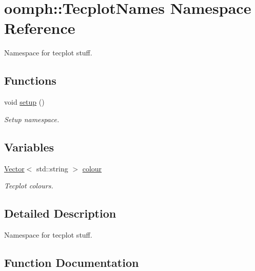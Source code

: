 \hypertarget{namespaceoomph_1_1TecplotNames}{}\section{oomph\+:\+:Tecplot\+Names Namespace Reference}
\label{namespaceoomph_1_1TecplotNames}


Namespace for tecplot stuff.  


\subsection*{Functions}
\begin{DoxyCompactItemize}
\item 
void \hyperlink{namespaceoomph_1_1TecplotNames_ad453a1e2569435e1d28aed2abe025cdd}{setup} ()
\begin{DoxyCompactList}\small\item\em Setup namespace. \end{DoxyCompactList}\end{DoxyCompactItemize}
\subsection*{Variables}
\begin{DoxyCompactItemize}
\item 
\hyperlink{classoomph_1_1Vector}{Vector}$<$ std\+::string $>$ \hyperlink{namespaceoomph_1_1TecplotNames_a628a7d88afc7542861c9afd2f4ea498c}{colour}
\begin{DoxyCompactList}\small\item\em Tecplot colours. \end{DoxyCompactList}\end{DoxyCompactItemize}


\subsection{Detailed Description}
Namespace for tecplot stuff. 

\subsection{Function Documentation}
\mbox{\label{namespaceoomph_1_1TecplotNames_ad453a1e2569435e1d28aed2abe025cdd}} 
